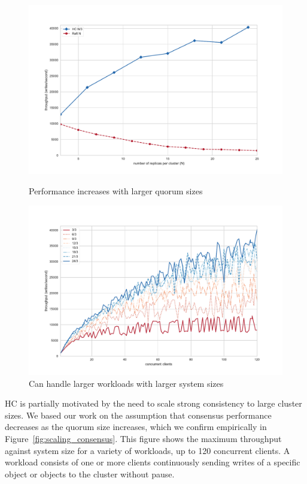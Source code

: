 \documentclass[11pt,conference]{IEEEtran}
\begin{document}
\begin{figure}[t]
    \centering
        \includegraphics[width=\linewidth]{figures/scaling.pdf}
        \caption{Performance increases with larger quorum sizes}
        \label{fig:scaling_consensus}
    \endminipage\hfill
        \includegraphics[width=\linewidth]{figures/hc_throughput_workload.pdf}
        \caption{Can handle larger workloads with larger system sizes}
        \label{fig:throughput_workload}
    \endminipage
\end{figure}

HC is partially motivated by the need to scale strong consistency to large cluster sizes.
We based our work on the assumption that consensus performance decreases as the quorum 
size increases, which we confirm empirically in Figure~\ref{fig:scaling_consensus}.
This figure shows the maximum throughput against system size for a variety of workloads, 
up to 120 concurrent clients.
A workload consists of one or more clients continuously sending writes of a specific 
object or objects to the cluster without pause.
\end{document}
